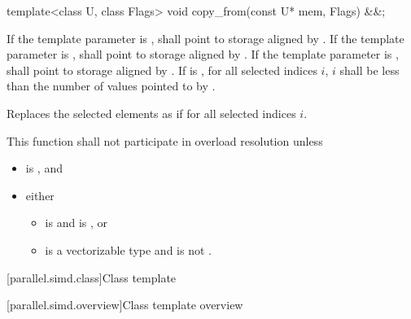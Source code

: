 \begin{itemdecl}
template<class U, class Flags> void copy_from(const U* mem, Flags) &&;
\end{itemdecl}

\begin{itemdescr}
  \pnum\requires
  If the template parameter  is ,  shall point to storage aligned by . If the template parameter  is ,  shall point to storage aligned by . If the template parameter  is ,  shall point to storage aligned by . If  is , for all selected indices $i$, $i$ shall be less than the number of values pointed to by .

  \pnum\effects
  Replaces the selected elements as if  for all selected indices $i$.

  \pnum\remarks
  This function shall not participate in overload resolution unless
  \begin{itemize}
    \item {} is , and
    \item either
      \begin{itemize}
        \item {} is  and  is , or
        \item {} is a vectorizable type and  is not .
      \end{itemize}
  \end{itemize}
\end{itemdescr}

[parallel.simd.class]{Class template }

[parallel.simd.overview]{Class template  overview}


